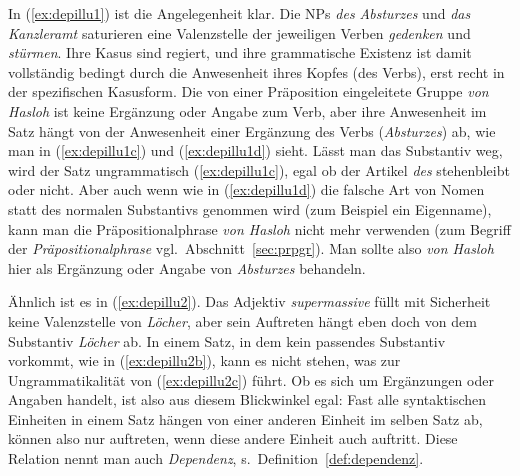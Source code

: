 \begin{exe}
  \ex\label{ex:depillu1}
  \begin{xlist}
  \end{xlist}
  \ex\label{ex:depillu2}
  \begin{xlist}
  \end{xlist}
\end{exe}


In (\ref{ex:depillu1}) ist die Angelegenheit klar.
Die NPs \textit{des Absturzes} und \textit{das Kanzleramt} saturieren eine Valenzstelle der jeweiligen Verben \textit{gedenken} und \textit{stürmen}.
Ihre Kasus sind regiert, und ihre grammatische Existenz ist damit vollständig bedingt durch die Anwesenheit ihres Kopfes (des Verbs), erst recht in der spezifischen Kasusform.
Die von einer Präposition eingeleitete Gruppe \textit{von Hasloh} ist keine Ergänzung oder Angabe zum Verb, aber ihre Anwesenheit im Satz hängt von der Anwesenheit einer Ergänzung des Verbs (\textit{Absturzes}) ab, wie man in (\ref{ex:depillu1c}) und (\ref{ex:depillu1d}) sieht.
Lässt man das Substantiv weg, wird der Satz ungrammatisch (\ref{ex:depillu1c}), egal ob der Artikel \textit{des} stehenbleibt oder nicht.
Aber auch wenn wie in (\ref{ex:depillu1d}) die falsche Art von Nomen statt des normalen Substantivs genommen wird (zum Beispiel ein Eigenname), kann man die Präpositionalphrase \textit{von Hasloh} nicht mehr verwenden (zum Begriff der \textit{Präpositionalphrase} vgl.\ Abschnitt~\ref{sec:prpgr}).
Man sollte also \textit{von Hasloh} hier als Ergänzung oder Angabe von \textit{Absturzes} behandeln.

Ähnlich ist es in (\ref{ex:depillu2}).
Das Adjektiv \textit{supermassive} füllt mit Sicherheit keine Valenzstelle von \textit{Löcher}, aber sein Auftreten hängt eben doch von dem Substantiv \textit{Löcher} ab.
In einem Satz, in dem kein passendes Substantiv vorkommt, wie in (\ref{ex:depillu2b}), kann es nicht stehen, was zur Ungrammatikalität von (\ref{ex:depillu2c}) führt.
Ob es sich um Ergänzungen oder Angaben handelt, ist also aus diesem Blickwinkel egal:
Fast alle syntaktischen Einheiten in einem Satz hängen von einer anderen Einheit im selben Satz ab, können also nur auftreten, wenn diese andere Einheit auch auftritt.
Diese Relation nennt man auch \textit{Dependenz}, s.\ Definition~\ref{def:dependenz}.


